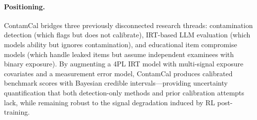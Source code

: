 \paragraph{Positioning.} ContamCal bridges three previously disconnected research threads: contamination detection (which flags but does not calibrate), IRT-based LLM evaluation (which models ability but ignores contamination), and educational item compromise models (which handle leaked items but assume independent examinees with binary exposure). By augmenting a 4PL IRT model with multi-signal exposure covariates and a measurement error model, ContamCal produces calibrated benchmark scores with Bayesian credible intervals---providing uncertainty quantification that both detection-only methods and prior calibration attempts lack, while remaining robust to the signal degradation induced by RL post-training.
